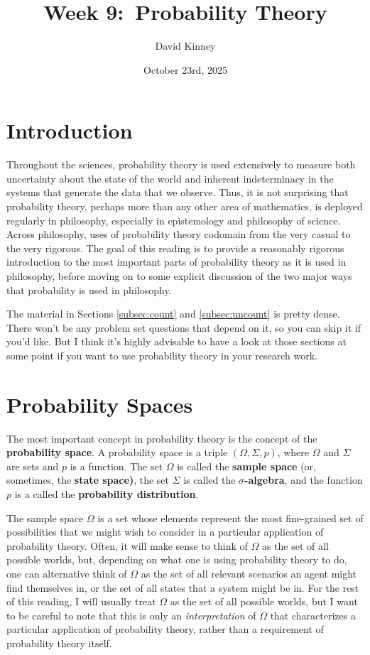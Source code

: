 \documentclass[11pt]{article}
\title{Week 9:\ Probability Theory}
\author{David Kinney}
\date{October 23rd, 2025}
\theoremstyle{definition}
\theoremstyle{remark}
\begin{document}
\maketitle

\section{Introduction}
Throughout the sciences, probability theory is used extensively to measure both uncertainty about the state of the world and inherent indeterminacy in the systems that generate the data that we observe. Thus, it is not surprising that probability theory, perhaps more than any other area of mathematics, is deployed regularly in philosophy, especially in epistemology and philosophy of science. Across philosophy, uses of probability theory codomain from the very casual to the very rigorous. The goal of this reading is to provide a reasonably rigorous introduction to the most important parts of probability theory as it is used in philosophy, before moving on to some explicit discussion of the two major ways that probability is used in philosophy.\par

The material in Sections \ref{subsec:count} and \ref{subsec:uncount} is pretty dense. There won't be any problem set questions that depend on it, so you can skip it if you'd like. But I think it's highly advisable to have a look at those sections at some point if you want to use probability theory in your research work.\par 


\section{Probability Spaces}
The most important concept in probability theory is the concept of the \textbf{probability space}. A probability space is a triple $(\Omega,\Sigma,p)$, where $\Omega$ and $\Sigma$ are sets and $p$ is a function. The set $\Omega$ is called the \textbf{sample space} (or, sometimes, the \textbf{state space)}, the set $\Sigma$ is called the \textbf{$\sigma$-algebra}, and the function $p$ is a called the \textbf{probability distribution}.\par

The sample space $\Omega$ is a set whose elements represent the most fine-grained set of possibilities that we might wish to consider in a particular application of probability theory. Often, it will make sense to think of $\Omega$ as the set of all possible worlds, but, depending on what one is using probability theory to do, one can alternative think of $\Omega$ as the set of all relevant scenarios an agent might find themselves in, or the set of all states that a system might be in. For the rest of this reading, I will usually treat $\Omega$ as the set of all possible worlds, but I want to be careful to note that this is only an \textit{interpretation} of $\Omega$ that characterizes a particular application of probability theory, rather than a requirement of probability theory itself.\par 
\end{document}
